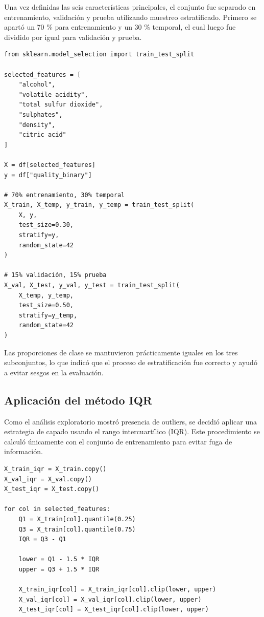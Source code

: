 \documentclass[conference]{IEEEtran}
\begin{document}
Una vez definidas las seis características principales, el conjunto fue separado en entrenamiento, validación y prueba utilizando muestreo estratificado. Primero se apartó un 70 \% para entrenamiento y un 30 \% temporal, el cual luego fue dividido por igual para validación y prueba.

\begin{lstlisting}[caption={División del dataset en entrenamiento, validación y prueba}, label={lst:split}]
from sklearn.model_selection import train_test_split

selected_features = [
    "alcohol",
    "volatile acidity",
    "total sulfur dioxide",
    "sulphates",
    "density",
    "citric acid"
]

X = df[selected_features]
y = df["quality_binary"]

# 70% entrenamiento, 30% temporal
X_train, X_temp, y_train, y_temp = train_test_split(
    X, y,
    test_size=0.30,
    stratify=y,
    random_state=42
)

# 15% validación, 15% prueba
X_val, X_test, y_val, y_test = train_test_split(
    X_temp, y_temp,
    test_size=0.50,
    stratify=y_temp,
    random_state=42
)
\end{lstlisting}

Las proporciones de clase se mantuvieron prácticamente iguales en los tres subconjuntos, lo que indicó que el proceso de estratificación fue correcto y ayudó a evitar sesgos en la evaluación.

\subsection{Aplicación del método IQR}

Como el análisis exploratorio mostró presencia de outliers, se decidió aplicar una estrategia de capado usando el rango intercuartílico (IQR). Este procedimiento se calculó únicamente con el conjunto de entrenamiento para evitar fuga de información.

\begin{lstlisting}[caption={Tratamiento de outliers con IQR}, label={lst:iqr}]
X_train_iqr = X_train.copy()
X_val_iqr = X_val.copy()
X_test_iqr = X_test.copy()

for col in selected_features:
    Q1 = X_train[col].quantile(0.25)
    Q3 = X_train[col].quantile(0.75)
    IQR = Q3 - Q1

    lower = Q1 - 1.5 * IQR
    upper = Q3 + 1.5 * IQR

    X_train_iqr[col] = X_train_iqr[col].clip(lower, upper)
    X_val_iqr[col] = X_val_iqr[col].clip(lower, upper)
    X_test_iqr[col] = X_test_iqr[col].clip(lower, upper)
\end{lstlisting}
\end{document}

